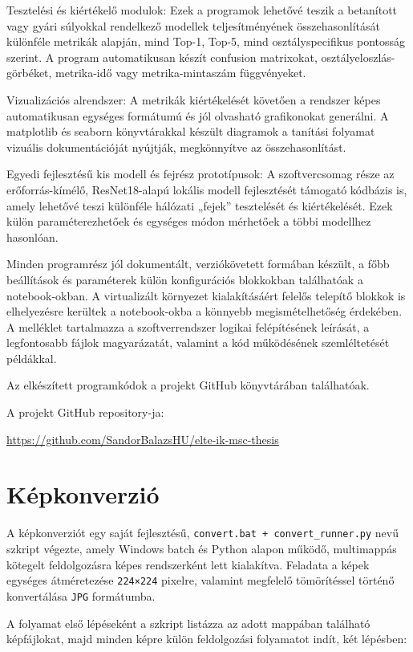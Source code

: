 \documentclass[	
  noindent
]{elteikthesis}[2024/04/26]
\begin{document}
        Tesztelési és kiértékelő modulok: Ezek a programok lehetővé teszik a betanított vagy gyári súlyokkal rendelkező modellek teljesítményének összehasonlítását különféle metrikák alapján, mind Top-1, Top-5, mind osztályspecifikus pontosság szerint. A program automatikusan készít confusion matrixokat, osztályeloszlás-görbéket, metrika-idő vagy metrika-mintaszám függvényeket.

        Vizualizációs alrendszer: A metrikák kiértékelését követően a rendszer képes automatikusan egységes formátumú és jól olvasható grafikonokat generálni. A matplotlib és seaborn könyvtárakkal készült diagramok a tanítási folyamat vizuális dokumentációját nyújtják, megkönnyítve az összehasonlítást.

        Egyedi fejlesztésű kis modell és fejrész prototípusok: A szoftvercsomag része az erőforrás-kímélő, ResNet18-alapú lokális modell fejlesztését támogató kódbázis is, amely lehetővé teszi különféle hálózati „fejek” tesztelését és kiértékelését. Ezek külön paraméterezhetőek és egységes módon mérhetőek a többi modellhez hasonlóan.

    Minden programrész jól dokumentált, verziókövetett formában készült, a főbb beállítások és paraméterek külön konfigurációs blokkokban találhatóak a notebook-okban. A virtualizált környezet kialakításáért felelős telepítő blokkok is elhelyezésre kerültek a notebook-okba a könnyebb megismételhetőség érdekében. A melléklet tartalmazza a szoftverrendszer logikai felépítésének leírását, a legfontosabb fájlok magyarázatát, valamint a kód működésének szemléltetését példákkal.

    Az elkészített programkódok a projekt GitHub könyvtárában találhatóak. 

    A projekt GitHub repository-ja:

    \url{https://github.com/SandorBalazsHU/elte-ik-msc-thesis}

    \section{Képkonverzió}
      A képkonverziót egy saját fejlesztésű, \texttt{convert.bat + convert\_runner.py} nevű szkript végezte, amely Windows batch és Python alapon működő, multimappás kötegelt feldolgozásra képes rendszerként lett kialakítva. Feladata a képek egységes átméretezése \texttt{224×224} pixelre, valamint megfelelő tömörítéssel történő konvertálása \texttt{JPG} formátumba.
      
      A folyamat első lépéseként a szkript listázza az adott mappában található képfájlokat, majd minden képre külön feldolgozási folyamatot indít, két lépésben:
      
\end{document}
